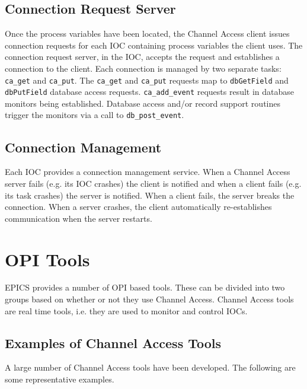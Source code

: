 \subsection{Connection Request Server}

Once the process variables have been located, the Channel Access client issues connection requests for each IOC 
containing process variables the client uses. The connection request server, in the IOC, accepts the request and establishes 
a connection to the client. Each connection is managed by two separate tasks: \verb|ca_get| and \verb|ca_put|. The \verb|ca_get| and 
\verb|ca_put| requests map to \verb|dbGetField| and \verb|dbPutField| database access requests. \verb|ca_add_event| requests result in 
database monitors being established. Database access and/or record support routines trigger the monitors via a call to 
\verb|db_post_event|.

\subsection{Connection Management}

Each IOC  provides a connection management service. When a Channel Access server fails (e.g. its IOC crashes) the 
client is notified and when a client fails (e.g. its task crashes) the server is notified. When a client fails, the server breaks 
the connection. When a server crashes, the client automatically re-establishes communication when the server restarts. 


\section{OPI Tools}

EPICS provides a number of OPI based tools. These can be divided into two groups based on whether or not they use 
Channel Access. Channel Access tools are real time tools, i.e. they are used to monitor and control IOCs.

\subsection{Examples of Channel Access Tools}

A large number of Channel Access tools have been developed. The following are some representative examples.

